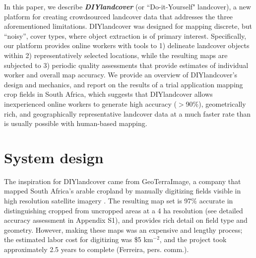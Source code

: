 \documentclass[preprint,12pt,authoryear]{elsarticle}
\begin{document}

In this paper, we describe \emph{\textbf{DIYlandcover}} (or ``Do-it-Yourself" landcover), a new platform for creating crowdsourced landcover data that addresses the three aforementioned limitations. DIYlandcover was designed for mapping discrete, but ``noisy'', cover types, where object extraction is of primary interest. Specifically, our platform provides online workers with tools to 1) delineate landcover objects within 2) representatively selected locations, while the resulting maps are subjected to 3) periodic quality assessments that provide estimates of individual worker and overall map accuracy. We provide an overview of DIYlandcover's design and mechanics, and report on the results of a trial application mapping crop fields in South Africa, which suggests that DIYlandcover allows inexperienced online workers to generate high accuracy ($>$90\%), geometrically rich, and geographically representative landcover data at a much faster rate than is usually possible with human-based mapping.



\section{System design}
The inspiration for DIYlandcover came from GeoTerraImage, a company that mapped South Africa's arable cropland by manually digitizing fields visible in high resolution satellite imagery  \citep{geoterraimage_south_2008}. The resulting map set is 97\% accurate in distinguishing cropped from uncropped areas at a 4 ha resolution (see detailed accuracy assessment in Appendix S1), and provides rich detail on field type and geometry. However, making these maps was an expensive and lengthy process; the estimated labor cost for digitizing was \$5 km$^{-2}$, and the project took approximately 2.5 years to complete (Ferreira, pers. comm.). 
\end{document}
